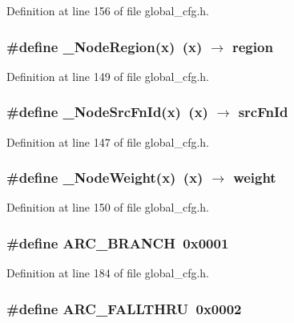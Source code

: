 Definition at line 156 of file global\_\-cfg.h.
\subsubsection{\setlength{\rightskip}{0pt plus 5cm}\#define \_\-Node\-Region(x)~(x) $\rightarrow$ \bf{region}}\label{global__cfg_8h_a03cfc44fb9711b8a927dd512ee09ce8}




Definition at line 149 of file global\_\-cfg.h.
\subsubsection{\setlength{\rightskip}{0pt plus 5cm}\#define \_\-Node\-Src\-Fn\-Id(x)~(x) $\rightarrow$ src\-Fn\-Id}\label{global__cfg_8h_427e3e98a9abad35647076f963e8e305}




Definition at line 147 of file global\_\-cfg.h.
\subsubsection{\setlength{\rightskip}{0pt plus 5cm}\#define \_\-Node\-Weight(x)~(x) $\rightarrow$ weight}\label{global__cfg_8h_d45099ede1c2f3a1eae1b5fda3939510}




Definition at line 150 of file global\_\-cfg.h.
\subsubsection{\setlength{\rightskip}{0pt plus 5cm}\#define ARC\_\-BRANCH~0x0001}\label{global__cfg_8h_3ad27c0e712e293d7ae3f981cbc076fb}




Definition at line 184 of file global\_\-cfg.h.
\subsubsection{\setlength{\rightskip}{0pt plus 5cm}\#define ARC\_\-FALLTHRU~0x0002}\label{global__cfg_8h_16a15cbd4c4a13a6607371fe0071ca51}




